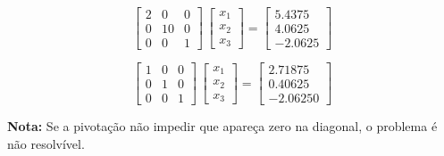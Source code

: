 \begin{example}
\[
 \left[
 \begin{array}{rrr}
   2 & 0 & 0 \\
   0 & 10 & 0 \\
   0 & 0 & 1
 \end{array}
 \right]
 \,
 \left[
 \begin{array}{r}
   x_1 \\
   x_2 \\
   x_3
 \end{array}
 \right]
 =
 \left[
 \begin{array}{r}
   5.4375 \\
   4.0625 \\
   -2.0625
 \end{array}
 \right]
\]

\[
 \left[
 \begin{array}{rrr}
   1 & 0 & 0 \\
   0 & 1 & 0 \\
   0 & 0 & 1
 \end{array}
 \right]
 \,
 \left[
 \begin{array}{r}
   x_1 \\
   x_2 \\
   x_3
 \end{array}
 \right]
 =
 \left[
 \begin{array}{r}
   2.71875 \\
   0.40625 \\
   -2.06250
 \end{array}
 \right]
\]

\end{example}

\textbf{Nota:} Se a pivotação não impedir que apareça zero na diagonal, o problema é não resolvível.

